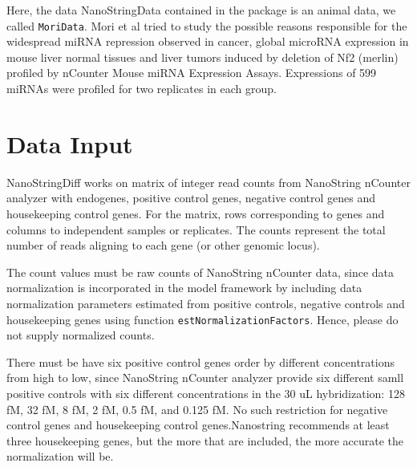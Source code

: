 \documentclass[12pt]{article}
\begin{document}
\begin{Schunk}
\end{Schunk}

Here, the data NanoStringData contained in the package is an animal data,
we called {\tt MoriData}\cite{mori2014hippo}. Mori et al tried to study the
possible reasons responsible for the widespread miRNA repression observed 
in cancer, global microRNA expression in mouse liver normal tissues and 
liver tumors induced by deletion of Nf2 (merlin) profiled by nCounter 
Mouse miRNA Expression Assays. Expressions of 599 miRNAs were profiled 
for two replicates in each group. 



\section{Data Input}
NanoStringDiff works on matrix of integer read counts from NanoString 
nCounter analyzer with endogenes, positive control genes, negative 
control genes and housekeeping control genes. For the matrix, rows 
corresponding to genes and columns to independent samples or replicates. 
The counts represent the total number of reads aligning to each gene
(or other genomic locus).

The count values must be raw counts of NanoString nCounter data, since 
data normalization is incorporated in the model framework by including 
data normalization parameters estimated from positive controls, negative 
controls and housekeeping genes using function {\tt estNormalizationFactors}. 
Hence, please do not supply normalized counts.

There must be have six positive control genes order by different 
concentrations from high to low, since NanoString nCounter analyzer 
provide six different samll positive controls with six different 
concentrations in the 30 uL hybridization: 128 fM, 32 fM, 8 fM, 
2 fM, 0.5 fM, and 0.125 fM. No such restriction for negative control 
genes and housekeeping control genes.Nanostring recommends at least 
three housekeeping genes, but the more that are included, the more 
accurate the normalization will be.
\end{document}
